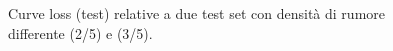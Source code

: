\documentclass[a4paper,12pt]{article}
\begin{document}
\begin{figure}[htp]
    \centering

    \medskip


    \caption{Curve loss (test) relative a due test set con densità di rumore differente (2/5) e (3/5).}
    \label{fig:c1-2}
\end{figure}
\end{document}
